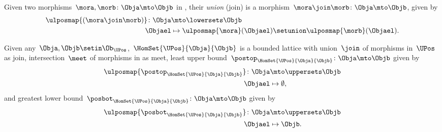 \begin{definition}
    Given two morphisms~$\mora,\morb\colon \Obja \mto \Objb$ in \LPos, their \emph{union} (join) is a morphism~$\mora \join \morb \colon \Obja \mto \Objb$, given by
    \begin{equation*}
        \begin{aligned}
            \ulposmap{(\mora \join \morb)}\colon \Obja & \mto \lowersets \Objb \\
            \Objael                                    & \mapsto \ulposmap{\mora}(\Objael) \setunion \ulposmap{\morb}(\Objael).
        \end{aligned}
    \end{equation*}
\end{definition}

\begin{lemma}
    \label{lem:UPos-is-bounded-lattice}
    Given any~$\Obja,\Objb\setin \Ob_\UPos$,~$\HomSet{\UPos}{\Obja}{\Objb}$ is a bounded lattice with union~$\join$ of morphisms in~$\UPos$ as join, intersection~$\meet$ of morphisms in \UPos as meet, least upper bound~$\postop_{\HomSet{\UPos}{\Obja}{\Objb}}\colon \Obja \mto \Objb$ given by
    \begin{equation*}
        \begin{aligned}
            \ulposmap{\postop_{\HomSet{\UPos}{\Obja}{\Objb}}}\colon \Obja & \mto \uppersets \Objb \\
            \Objael                                                       & \mapsto \emptyset,
        \end{aligned}
    \end{equation*}
    and greatest lower bound~$\posbot_{\HomSet{\UPos}{\Obja}{\Objb}}\colon \Obja \mto \Objb$ given by
    \begin{equation*}
        \begin{aligned}
            \ulposmap{\posbot_{\HomSet{\UPos}{\Obja}{\Objb}}}\colon \Obja & \mto \uppersets \Objb \\
            \Objael                                                       & \mapsto \Objb.
        \end{aligned}
    \end{equation*}
\end{lemma}
